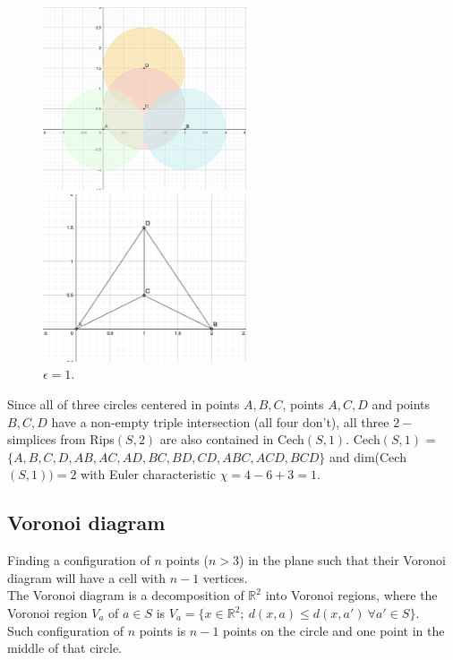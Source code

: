 \documentclass[a4paper,11pt]{article}
\begin{document}
\begin{figure}[ht!]
    \begin{minipage}{0.5\textwidth}
        \centering
        \includegraphics[width=60mm]{r1.png}
        \caption{$\epsilon = 1$.}
    \end{minipage}\hfill
    \begin{minipage}{0.5\textwidth}
        \centering
        \includegraphics[width=60mm]{1povezave.png}
        \caption{$\epsilon = 1$.}
    \end{minipage}\hfill
\end{figure}
\noindent
Since all of three circles centered in points $A, B, C$, points $A, C, D$ and points $B, C, D$ have a non-empty triple intersection (all four don't), all three $2-$simplices from Rips$(S, 2)$ are also contained in Cech$(S, 1)$.
Cech$(S, 1)$ = $\{A, B, C, D, AB, AC, AD, BC, BD, CD, ABC, ACD, BCD\}$ and dim(Cech$(S, 1)) = 2$ with Euler characteristic $\chi = 4 - 6 + 3 = 1$.


\subsection{Voronoi diagram}
Finding a configuration of $n$ points ($n >3$) in the plane such that their Voronoi diagram will have a cell with $n−1$ vertices.
\\
The Voronoi diagram is a decomposition of $\mathbb{R}^2$ into Voronoi regions, where the Voronoi region $V_a$ of $a \in S$ is $V_a = \{ x \in \mathbb{R}^2 ; \ d(x, a) \leq d(x, a') \ \forall a' \in S \}$.
\\
Such configuration of $n$ points is $n - 1$ points on the circle and one point in the middle of that circle.
\end{document}
